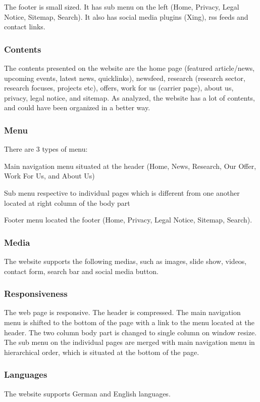 The footer is small sized. It has sub menu on the left (Home, Privacy, Legal Notice, Sitemap, Search). It also has social media plugins (Xing), \ac{rss} feeds and contact links.

\subsubsection*{Contents}
The contents presented on the website are the home page (featured article/news, upcoming events, latest news, quicklinks), newsfeed, research (research sector, research focuses, projects etc), offers, work for us (carrier page), about us, privacy, legal notice, and sitemap. As analyzed, the website has a lot of contents, and could have been organized in a better way.

\subsubsection*{Menu}
There are 3 types of menu:
\begin{itemize*}
\item Main navigation menu situated at the header (Home, News, Research, Our Offer, Work For Us, and About Us)
\item Sub menu respective to individual pages which is different from one another located at right column of the body part
\item Footer menu located the footer (Home, Privacy, Legal Notice, Sitemap, Search).
\end{itemize*}

\subsubsection*{Media}
The website supports the following medias, such as images, slide show, videos, contact form, search bar and social media button.

\subsubsection*{Responsiveness}
The web page is responsive. The header is compressed. The main navigation menu is shifted to the bottom of the page with a link to the menu located at the header. The two column body part is changed to single column on window resize. The sub menu on the individual pages are merged with main navigation menu in hierarchical order, which is situated at the bottom of the page.

\subsubsection*{Languages}
The website supports German and English languages.

